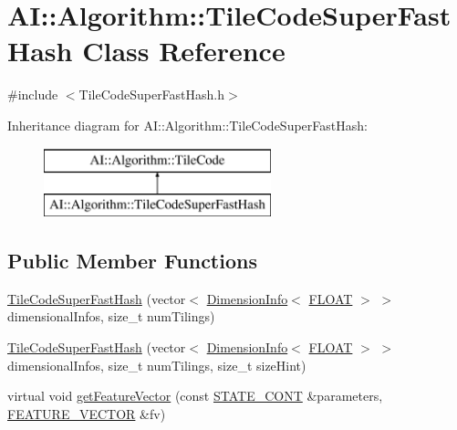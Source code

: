 \hypertarget{classAI_1_1Algorithm_1_1TileCodeSuperFastHash}{\section{A\-I\-:\-:Algorithm\-:\-:Tile\-Code\-Super\-Fast\-Hash Class Reference}
\label{classAI_1_1Algorithm_1_1TileCodeSuperFastHash}
}


{\ttfamily \#include $<$Tile\-Code\-Super\-Fast\-Hash.\-h$>$}

Inheritance diagram for A\-I\-:\-:Algorithm\-:\-:Tile\-Code\-Super\-Fast\-Hash\-:\begin{figure}[H]
\begin{center}
\leavevmode
\includegraphics[height=2.000000cm]{classAI_1_1Algorithm_1_1TileCodeSuperFastHash}
\end{center}
\end{figure}
\subsection*{Public Member Functions}
\begin{DoxyCompactItemize}
\item 
\hyperlink{classAI_1_1Algorithm_1_1TileCodeSuperFastHash_a7538ed36cf8ae0a15ff4c902a335266b}{Tile\-Code\-Super\-Fast\-Hash} (vector$<$ \hyperlink{classAI_1_1Algorithm_1_1DimensionInfo}{Dimension\-Info}$<$ \hyperlink{namespaceAI_a41b74884a20833db653dded3918e05c3}{F\-L\-O\-A\-T} $>$ $>$ dimensional\-Infos, size\-\_\-t num\-Tilings)
\item 
\hyperlink{classAI_1_1Algorithm_1_1TileCodeSuperFastHash_a724f6d6f40f0f8f2e4d4692eb3f6c09f}{Tile\-Code\-Super\-Fast\-Hash} (vector$<$ \hyperlink{classAI_1_1Algorithm_1_1DimensionInfo}{Dimension\-Info}$<$ \hyperlink{namespaceAI_a41b74884a20833db653dded3918e05c3}{F\-L\-O\-A\-T} $>$ $>$ dimensional\-Infos, size\-\_\-t num\-Tilings, size\-\_\-t size\-Hint)
\item 
virtual void \hyperlink{classAI_1_1Algorithm_1_1TileCodeSuperFastHash_a46f0df02799eb67bc8fb574b265e7e67}{get\-Feature\-Vector} (const \hyperlink{namespaceAI_aff63ec21d97dd5f086fddbc3103f5707}{S\-T\-A\-T\-E\-\_\-\-C\-O\-N\-T} \&parameters, \hyperlink{namespaceAI_a23a39e1b301a5c1345fa508796940631}{F\-E\-A\-T\-U\-R\-E\-\_\-\-V\-E\-C\-T\-O\-R} \&fv)
\end{DoxyCompactItemize}
